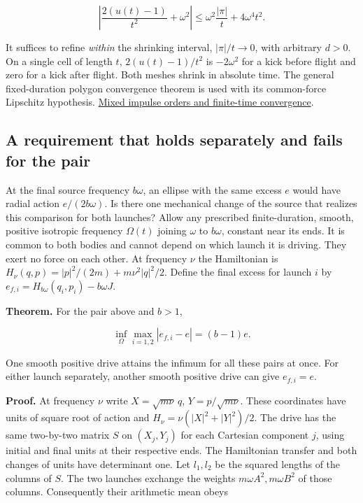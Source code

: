 \documentclass[11pt,a4paper]{article}
\begin{document}
\[
 \left|\frac{2(u(t)-1)}{t^2}+\omega^2\right|
 \le \omega^2\frac{|\pi|}{t}+4\omega^4t^2.                          \tag{3}
\]

It suffices to refine \emph{within} the shrinking interval,
\(|\pi|/t\to0\), with arbitrary \(d>0\). On a single cell of length
\(t\), \(2(u(t)-1)/t^2\) is \(-2\omega^2\) for a kick before flight and
zero for a kick after flight. Both meshes shrink in absolute time. The
general fixed-duration polygon convergence theorem is used with its
common-force Lipschitz hypothesis.
\href{https://arivero.github.io/navstokgap/notes/balaban-ode-lesson.html\#start-with-a-finite-newton-polygon}{Mixed
impulse orders and finite-time convergence}.

\subsection{A requirement that holds separately and fails for the
pair}\label{a-requirement-that-holds-separately-and-fails-for-the-pair}

At the final source frequency \(b\omega\), an ellipse with the same
excess \(e\) would have radial action \(e/(2b\omega)\). Is there one
mechanical change of the source that realizes this comparison for both
launches? Allow any prescribed finite-duration, smooth, positive
isotropic frequency \(\Omega(t)\) joining \(\omega\) to \(b\omega\),
constant near its ends. It is common to both bodies and cannot depend on
which launch it is driving. They exert no force on each other. At
frequency \(\nu\) the Hamiltonian is
\(H_\nu(q,p)=|p|^2/(2m)+m\nu^2|q|^2/2\). Define the final excess for
launch \(i\) by \(e_{f,i}=H_{b\omega}(q_i,p_i)-b\omega J\).

\textbf{Theorem.} For the pair above and \(b>1\),

\[
 \inf_{\Omega}\max_{i=1,2}|e_{f,i}-e|=(b-1)e.                       \tag{4}
\]

One smooth positive drive attains the infimum for all these pairs at
once. For either launch separately, another smooth positive drive can
give \(e_{f,i}=e\).

\textbf{Proof.} At frequency \(\nu\) write \(X=\sqrt{m\nu}\,q\),
\(Y=p/\sqrt{m\nu}\). These coordinates have units of square root of
action and \(H_\nu=\nu(|X|^2+|Y|^2)/2\). The drive has the same
two-by-two matrix \(S\) on \((X_j,Y_j)\) for each Cartesian component
\(j\), using initial and final units at their respective ends. The
Hamiltonian transfer and both changes of units have determinant one. Let
\(l_1,l_2\) be the squared lengths of the columns of \(S\). The two
launches exchange the weights \(m\omega A^2,m\omega B^2\) of those
columns. Consequently their arithmetic mean obeys
\end{document}
